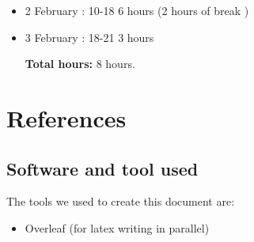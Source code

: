\documentclass[a4paper]{article}
\begin{document}
\begin{itemize}
\item 2 February : 10-18 6 hours (2 hours of break )
\item 3 February : 18-21 3 hours

\textbf{Total hours:} 8 hours.
\end{itemize}

\newpage
\section{References}
\subsection{Software and tool used}
The tools we used to create this document are:
\begin{itemize}
\item Overleaf (for latex writing in parallel)
\end{itemize}
\end{document}

